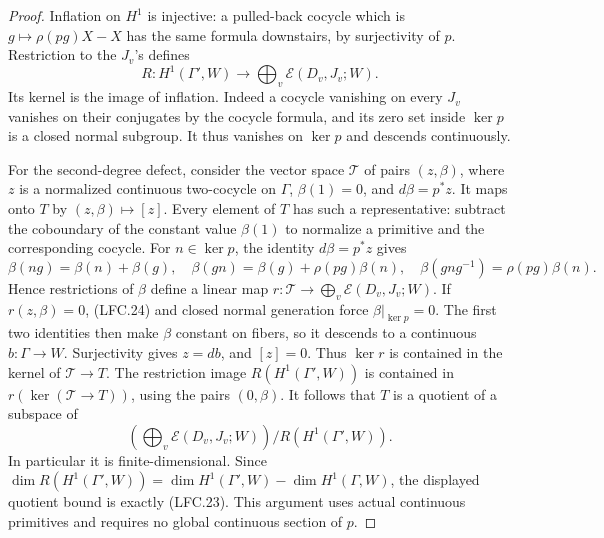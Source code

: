 \begin{proof}
Inflation on \(H^1\) is injective: a pulled-back
cocycle which is \(g\mapsto\rho(p g)X-X\) has the
same formula downstairs, by surjectivity of \(p\).
Restriction to the \(J_v\)'s defines
\[
 R:H^1(\Gamma',W)\longrightarrow
                  \bigoplus_v\mathcal E(D_v,J_v;W).
 \]
Its kernel is the image of inflation.
Indeed a cocycle vanishing on every \(J_v\) vanishes
on their conjugates by the cocycle formula, and its zero
set inside \(\ker p\) is a closed normal subgroup.
It thus vanishes on \(\ker p\) and descends continuously.

For the second-degree defect, consider the vector space
\(\mathcal T\) of pairs \((z,\beta)\), where \(z\) is a
normalized continuous two-cocycle on \(\Gamma\),
\(\beta(1)=0\), and \(d\beta=p^*z\).
It maps onto \(T\) by \((z,\beta)\mapsto[z]\).
Every element of \(T\) has such a representative:
subtract the coboundary of the constant value \(\beta(1)\)
to normalize a primitive and the corresponding cocycle.
For \(n\in\ker p\), the identity \(d\beta=p^*z\) gives
\[
 \beta(ng)=\beta(n)+\beta(g),\quad
 \beta(gn)=\beta(g)+\rho(p g)\beta(n),\quad
 \beta(gng^{-1})=\rho(p g)\beta(n).                       \tag{LFC.24}
\]
Hence restrictions of \(\beta\) define a linear map
\(r:\mathcal T\to\bigoplus_v\mathcal E(D_v,J_v;W)\).
If \(r(z,\beta)=0\), (LFC.24) and closed normal generation
force \(\beta|_{\ker p}=0\).
The first two identities then make \(\beta\) constant
on fibers, so it descends to a continuous \(b:\Gamma\to W\).
Surjectivity gives \(z=db\), and \([z]=0\).
Thus \(\ker r\) is contained in the kernel of
\(\mathcal T\to T\).
The restriction image \(R(H^1(\Gamma',W))\) is contained
in \(r(\ker(\mathcal T\to T))\), using the pairs \((0,\beta)\).
It follows that \(T\) is a quotient of a subspace of
\[
 \left(\bigoplus_v\mathcal E(D_v,J_v;W)\right)
                    \big/R(H^1(\Gamma',W)).
 \]
In particular it is finite-dimensional.
Since
\(\dim R(H^1(\Gamma',W))=
 \dim H^1(\Gamma',W)-\dim H^1(\Gamma,W)\),
the displayed quotient bound is exactly (LFC.23).
This argument uses actual continuous primitives and
requires no global continuous section of \(p\).
\end{proof}

